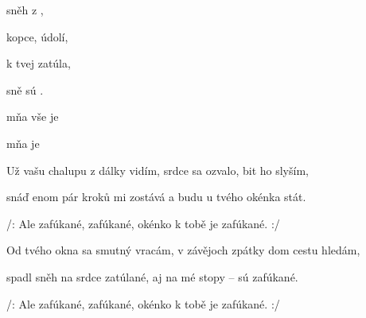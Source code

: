





\zs
{} sněh  z  ,

  kopce,  údolí, 

 k tvej  zatúla,

 sně sú .   
 
\ks

\zr
{} 

 mňa vše je  

  

 mňa  je    
       
\kr

\zs
Už vašu chalupu z dálky vidím, srdce sa ozvalo, bit ho slyším,

snáď enom pár kroků mi zostává a budu u tvého okénka stát.
\ks

\zr
/: Ale zafúkané, zafúkané, okénko k tobě je zafúkané. :/
\kr

\zs
Od tvého okna sa smutný vracám, v závějoch zpátky dom cestu hledám,

spadl sněh na srdce zatúlané, aj na mé stopy -- sú zafúkané.
\ks

\zr
/: Ale zafúkané, zafúkané, okénko k tobě je zafúkané. :/
\kr







\kp
























